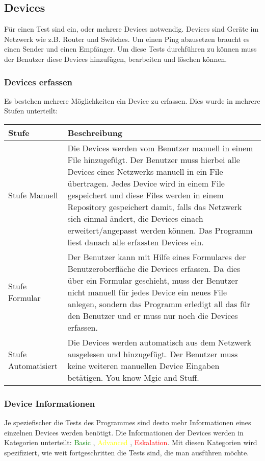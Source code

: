 \documentclass[
	ngerman,
	toc=listof, %
	toc=bibliography, %
	footnotes=multiple, %
	parskip=half, %
	numbers=noendperiod %
]{scrartcl}
\begin{document}
	\subsection{Devices}
		Für einen Test sind ein, oder mehrere Devices notwendig. Devices sind Geräte im Netzwerk wie z.B. Router und Switches.
		Um einen Ping abzusetzen braucht es einen Sender und einen Empfänger.
		Um diese Tests durchführen zu können muss der Benutzer diese Devices hinzufügen, bearbeiten und löschen können. 

		\subsubsection{Devices erfassen}
			Es bestehen mehrere Möglichkeiten ein Device zu erfassen. Dies wurde in mehrere Stufen unterteilt:\\

			\begin{tabularx}{\textwidth}{lX}
				\toprule
				Stufe & Beschreibung\\
				\midrule
				Stufe Manuell & Die Devices werden vom Benutzer manuell in einem File hinzugefügt. Der Benutzer muss hierbei alle Devices eines Netzwerks manuell in ein File übertragen. Jedes Device wird in einem File gespeichert und diese Files werden in einem Repository gespeichert damit, falls das Netzwerk sich einmal ändert, die Devices einach erweitert/angepasst werden können. Das Programm liest danach alle erfassten Devices ein. \\
				\midrule
				Stufe Formular & Der Benutzer kann mit Hilfe eines Formulares der Benutzeroberfläche die Devices erfassen. Da dies über ein Formular geschieht, muss der Benutzer nicht manuell für jedes Device ein neues File anlegen, sondern das Programm erledigt all das für den Benutzer und er muss nur noch die Devices erfassen.\\
				\midrule
				Stufe Automatisiert & Die Devices werden automatisch aus dem Netzwerk ausgelesen und hinzugefügt. Der Benutzer muss keine weiteren manuellen Device Eingaben betätigen. You know Mgic and Stuff. \\
				\bottomrule
			\end{tabularx}

		\subsubsection{Device Informationen}
			Je speziefischer die Tests des Programmes sind desto mehr Informationen eines einzelnen Devices werden benötigt.
			Die Informationen der Devices werden in Kategorien unterteilt: \textcolor{green}{Basic} , \textcolor{yellow}{Advanced} , \textcolor{red}{Eskalation}.
			Mit diesen Kategorien wird spezifiziert, wie weit fortgeschritten die Tests sind, die man ausführen möchte. \\
\end{document}
